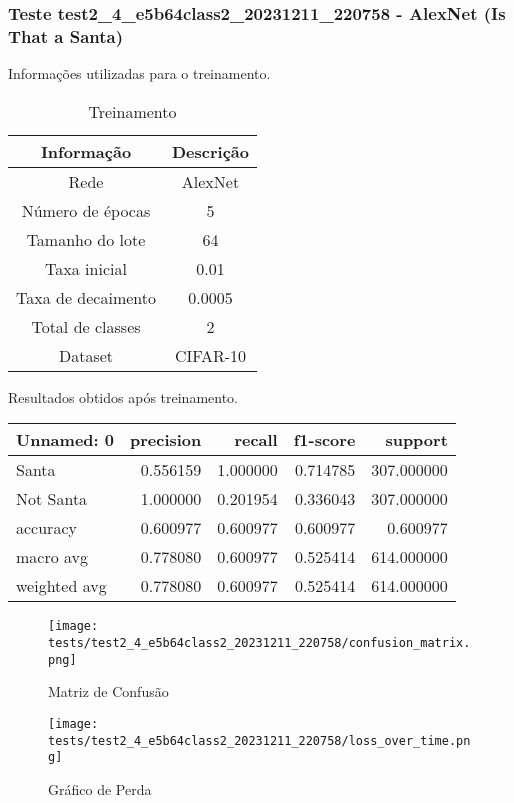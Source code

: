 \subsubsection{Teste test2_4_e5b64class2_20231211_220758 - AlexNet (Is That a Santa)}

Informações utilizadas para o treinamento.

\begin{table}[ht]
   \centering
   \caption{Treinamento}
   \label{tab:modelos}
   \begin{tabular}{| c | c | }
      \hline 
      \textbf{Informação} & \textbf{Descrição} \\
      \hline \hline 
      Rede & AlexNet \\
      \hline
      Número de épocas & 5\\
      \hline
      Tamanho do lote & 64\\
      \hline
      Taxa inicial & 0.01 \\
      \hline
      Taxa de decaimento & 0.0005 \\
      \hline
      Total de classes & 2\\
      \hline
      Dataset & CIFAR-10\\
      \hline
   \end{tabular} 
\end{table}

Resultados obtidos após treinamento.

\begin{tabular}{lrrrr}
\toprule
  Unnamed: 0 &  precision &   recall &  f1-score &    support \\
\midrule
       Santa &   0.556159 & 1.000000 &  0.714785 & 307.000000 \\
   Not Santa &   1.000000 & 0.201954 &  0.336043 & 307.000000 \\
    accuracy &   0.600977 & 0.600977 &  0.600977 &   0.600977 \\
   macro avg &   0.778080 & 0.600977 &  0.525414 & 614.000000 \\
weighted avg &   0.778080 & 0.600977 &  0.525414 & 614.000000 \\
\bottomrule
\end{tabular}


\begin{figure}[ht]
 \begin{center}
   \texttt{[image: tests/test2\_4\_e5b64class2\_20231211\_220758/confusion\_matrix.png]}
  \caption{Matriz de Confusão}
  \label{fig:fig03}
 \end{center}
\end{figure}

\begin{figure}[ht]
 \begin{center}
   \texttt{[image: tests/test2\_4\_e5b64class2\_20231211\_220758/loss\_over\_time.png]}
  \caption{Gráfico de Perda}
  \label{fig:fig04}
 \end{center}
\end{figure}
